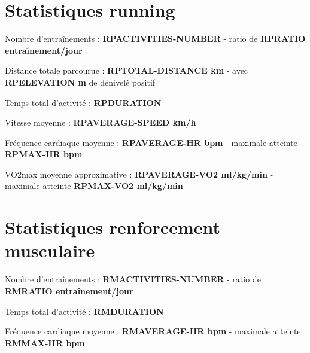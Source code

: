 \documentclass[a4paper,french,11pt]{report}
\begin{document}

\section*{Statistiques running}
\thispagestyle{empty}


\textbullet Nombre d'entraînements : \textbf{RPACTIVITIES-NUMBER} -
ratio de \textbf{RPRATIO entraînement/jour}

\textbullet Distance totale parcourue : \textbf{RPTOTAL-DISTANCE km} -
avec \textbf{RPELEVATION m} de dénivelé positif

\textbullet Temps total d'activité : \textbf{RPDURATION}

\textbullet Vitesse moyenne : \textbf{RPAVERAGE-SPEED km/h}

\textbullet Fréquence cardiaque moyenne : \textbf{RPAVERAGE-HR bpm} -
maximale atteinte \textbf{RPMAX-HR bpm}

\textbullet VO2max moyenne approximative : \textbf{RPAVERAGE-VO2 ml/kg/min} -
maximale atteinte \textbf{RPMAX-VO2 ml/kg/min}


\section*{Statistiques renforcement musculaire}
\thispagestyle{empty}


\textbullet Nombre d'entraînements : \textbf{RMACTIVITIES-NUMBER} -
ratio de \textbf{RMRATIO entraînement/jour}

\textbullet Temps total d'activité : \textbf{RMDURATION}

\textbullet Fréquence cardiaque moyenne : \textbf{RMAVERAGE-HR bpm} -
maximale atteinte \textbf{RMMAX-HR bpm}

\end{document}
